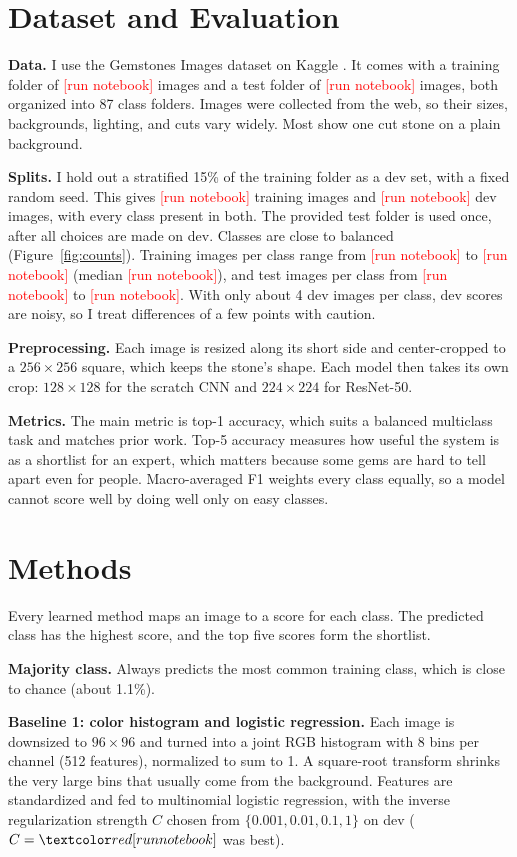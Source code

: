 \documentclass{article}
\newcommand{\fillin}[1]{\textcolor{red}{[#1]}}
\newcommand{\pending}{\fillin{run notebook}}
\providecommand{\NClasses}{87}
\providecommand{\NTrainFull}{\pending}\providecommand{\NTrain}{\pending}
\providecommand{\NDev}{\pending}\providecommand{\NTest}{\pending}
\providecommand{\TrainMin}{\pending}\providecommand{\TrainMax}{\pending}
\providecommand{\TrainMed}{\pending}\providecommand{\TestMin}{\pending}
\providecommand{\TestMax}{\pending}\providecommand{\DevErrors}{\pending}
\begin{document}
\section{Dataset and Evaluation}

\textbf{Data.} I use the Gemstones Images dataset on Kaggle \citep{lsind18gemstones}. It comes with a training folder of \NTrainFull{} images and a test folder of \NTest{} images, both organized into \NClasses{} class folders. Images were collected from the web, so their sizes, backgrounds, lighting, and cuts vary widely. Most show one cut stone on a plain background.

\textbf{Splits.} I hold out a stratified 15\% of the training folder as a dev set, with a fixed random seed. This gives \NTrain{} training images and \NDev{} dev images, with every class present in both. The provided test folder is used once, after all choices are made on dev. Classes are close to balanced (Figure~\ref{fig:counts}). Training images per class range from \TrainMin{} to \TrainMax{} (median \TrainMed{}), and test images per class from \TestMin{} to \TestMax{}. With only about 4 dev images per class, dev scores are noisy, so I treat differences of a few points with caution.

\textbf{Preprocessing.} Each image is resized along its short side and center-cropped to a $256\times256$ square, which keeps the stone's shape. Each model then takes its own crop: $128\times128$ for the scratch CNN and $224\times224$ for ResNet-50.

\textbf{Metrics.} The main metric is top-1 accuracy, which suits a balanced multiclass task and matches prior work. Top-5 accuracy measures how useful the system is as a shortlist for an expert, which matters because some gems are hard to tell apart even for people. Macro-averaged F1 weights every class equally, so a model cannot score well by doing well only on easy classes.

\section{Methods}

Every learned method maps an image to a score for each class. The predicted class has the highest score, and the top five scores form the shortlist.

\textbf{Majority class.} Always predicts the most common training class, which is close to chance (about 1.1\%).

\textbf{Baseline 1: color histogram and logistic regression.} Each image is downsized to $96\times96$ and turned into a joint RGB histogram with 8 bins per channel (512 features), normalized to sum to 1. A square-root transform shrinks the very large bins that usually come from the background. Features are standardized and fed to multinomial logistic regression, with the inverse regularization strength $C$ chosen from $\{0.001, 0.01, 0.1, 1\}$ on dev ($C=\LRC$ was best).
\end{document}

